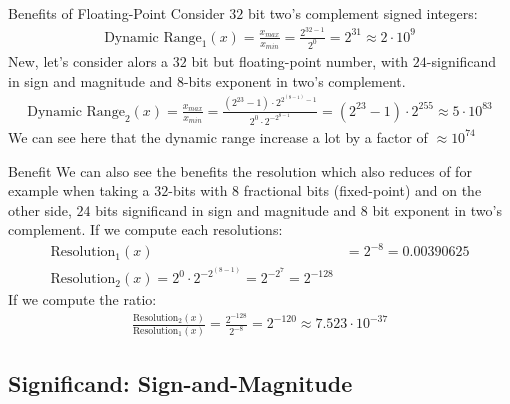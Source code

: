     \begin{parag}{Benefits of Floating-Point}
        Consider $32$ bit two's complement signed integers:
        \begin{align*}
            \text{Dynamic Range}_1(x) = \frac{x_{max}}{x_{min}} = \frac{2^{32-1}}{2^0} = 2^31 \approx 2 \cdot 10^9
        \end{align*}
        New, let's consider alors a $32$ bit but floating-point number, with $24$-significand in sign and magnitude and $8$-bits exponent in two's complement.
        \begin{align*}
            \text{Dynamic Range}_2(x) = \frac{x_{max}}{x_{min}} = \frac{(2^{23}-1) \cdot 2^{2^{(8-1)}-1}}{2^0 \cdot2^{-2^{8-1}}} = (2^{23} - 1) \cdot2^{255} \approx 5 \cdot 10^{83}
        \end{align*}
        We can see here that the dynamic range increase a lot by a factor of $ \approx 10^{74}$
        
    
    \end{parag}
    
    \begin{parag}{Benefit}
        We can also see the benefits the resolution which also reduces of for example when taking a $32$-bits with $8$ fractional bits (fixed-point) and on the other side, $24$ bits significand in sign and magnitude and $8$ bit exponent in two's complement. If we compute each resolutions:
        \begin{align*}
            \text{Resolution}_1 (x) &= 2^{-8} = 0.00390625 \\
            \text{Resolution}_2(x) = 2^0 \cdot2^{-2^{(8-1)}} = 2^{-2^7} = 2^{-128}
        \end{align*}
        If we compute the ratio:
        \begin{align*}
            \frac{ \text{Resolution}_2(x)}{ \text{Resolution}_1(x)} = \frac{2^{-128}}{2^{-8}} = 2^{-120} \approx 7.523 \cdot 10^{-37}
        \end{align*}
        
    
    \end{parag}
   \subsection{Significand: Sign-and-Magnitude}
    
